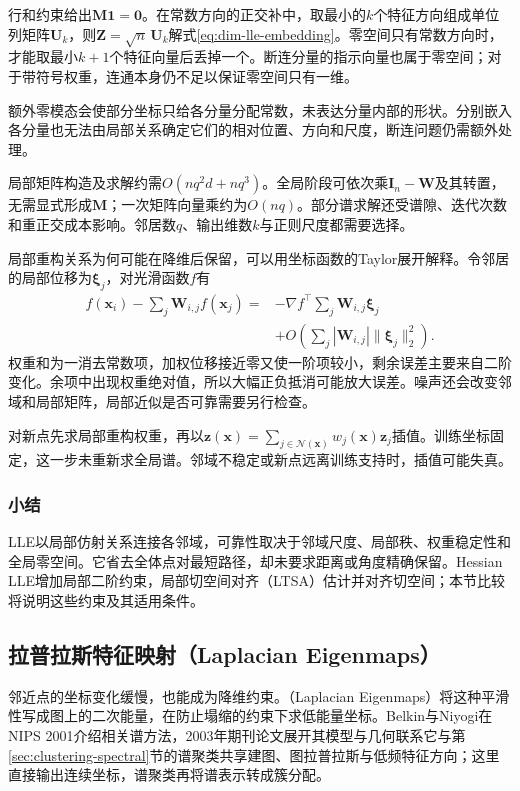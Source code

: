 行和约束给出$\bm{M}\bm{1}=\bm{0}$。在常数方向的正交补中，取最小的$k$个特征方向组成单位列矩阵$\bm{U}_k$，则$\bm{Z}=\sqrt n\,\bm{U}_k$解式\eqref{eq:dim-lle-embedding}。零空间只有常数方向时，才能取最小$k+1$个特征向量后丢掉一个。断连分量的指示向量也属于零空间；对于带符号权重，连通本身仍不足以保证零空间只有一维。

额外零模态会使部分坐标只给各分量分配常数，未表达分量内部的形状。分别嵌入各分量也无法由局部关系确定它们的相对位置、方向和尺度，断连问题仍需额外处理。

局部矩阵构造及求解约需$O(nq^2d+nq^3)$。全局阶段可依次乘$\bm{I}_n-\bm{W}$及其转置，无需显式形成$\bm{M}$；一次矩阵向量乘约为$O(nq)$。部分谱求解还受谱隙、迭代次数和重正交成本影响。邻居数$q$、输出维数$k$与正则尺度都需要选择。

局部重构关系为何可能在降维后保留，可以用坐标函数的Taylor展开解释。令邻居的局部位移为$\bm{\xi}_j$，对光滑函数$f$有
\[
  \begin{aligned}
    f(\bm{x}_i)-\sum_j\bm{W}_{i,j}f(\bm{x}_j)
    ={}&-\nabla f^{\top}\sum_j\bm{W}_{i,j}\bm{\xi}_j\\
       &+O\left(\sum_j|\bm{W}_{i,j}|
                  \lVert\bm{\xi}_j\rVert_2^2\right).
  \end{aligned}
\]
权重和为一消去常数项，加权位移接近零又使一阶项较小，剩余误差主要来自二阶变化。余项中出现权重绝对值，所以大幅正负抵消可能放大误差。噪声还会改变邻域和局部矩阵，局部近似是否可靠需要另行检查。

对新点先求局部重构权重，再以$\bm{z}(\bm{x})=\sum_{j\in\mathcal{N}(\bm{x})}w_j(\bm{x})\bm{z}_j$插值。训练坐标固定，这一步未重新求全局谱。邻域不稳定或新点远离训练支持时，插值可能失真。

\subsubsection{小结}

LLE以局部仿射关系连接各邻域，可靠性取决于邻域尺度、局部秩、权重稳定性和全局零空间。它省去全体点对最短路径，却未要求距离或角度精确保留。Hessian LLE增加局部二阶约束，局部切空间对齐（LTSA）估计并对齐切空间；本节比较将说明这些约束及其适用条件。

\subsection{拉普拉斯特征映射（Laplacian Eigenmaps）}
\label{sec:dim-le}

邻近点的坐标变化缓慢，也能成为降维约束。（Laplacian Eigenmaps）将这种平滑性写成图上的二次能量，在防止塌缩的约束下求低能量坐标。Belkin与Niyogi在NIPS 2001介绍相关谱方法，2003年期刊论文展开其模型与几何联系它与第\ref{sec:clustering-spectral}节的谱聚类共享建图、图拉普拉斯与低频特征方向；这里直接输出连续坐标，谱聚类再将谱表示转成簇分配。

